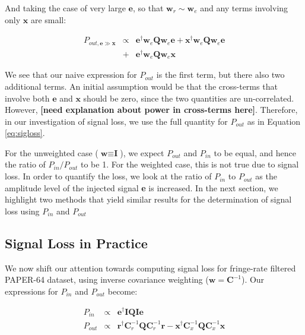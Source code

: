 \documentclass[preprint2,numberedappendix,tighten,twocolappendix]{aastex6}  %
\newcommand{\cc}[1]{{\color{purple} \textbf{[#1]}}}
\begin{document}
And taking the case of very large $\textbf{e}$, so that $\textbf{w}_{r} \sim \textbf{w}_{e}$ and any terms involving only $\textbf{x}$ are small:

\begin{eqnarray}
P_{out, \textbf{e} \gg \textbf{x}} &\propto& \textbf{e}^{\dagger}\textbf{w}_{e}\textbf{Q}\textbf{w}_{e}\textbf{e} + \textbf{x}^{\dagger}\textbf{w}_{e}\textbf{Q}\textbf{w}_{e}\textbf{e} \nonumber \\
&+& \textbf{e}^{\dagger}\textbf{w}_{e}\textbf{Q}\textbf{w}_{e}\textbf{x}
\end{eqnarray}

We see that our naive expression for $P_{out}$ is the first term, but there also two additional terms. An initial assumption would be that the cross-terms that involve both $\textbf{e}$ and $\textbf{x}$ should be zero, since the two quantities are un-correlated. However, \cc{need explanation about power in cross-terms here}. Therefore, in our investigation of signal loss, we use the full quantity for $P_{out}$ as in Equation \ref{eq:sigloss}.

For the unweighted case ($\textbf{w} \equiv \textbf{I}$), we expect $P_{out}$ and $P_{in}$ to be equal, and hence the ratio of $P_{in} / P_{out}$ to be 1. For the weighted case, this is not true due to signal loss. In order to quantify the loss, we look at the ratio of $P_{in}$ to $P_{out}$ as the amplitude level of the injected signal \textbf{e} is increased. In the next section, we highlight two methods that yield similar results for the determination of signal loss using $P_{in}$ and $P_{out}$

\subsection{Signal Loss in Practice}

We now shift our attention towards computing signal loss for fringe-rate filtered PAPER-64 dataset, using inverse covariance weighting ($\textbf{w} = \textbf{C}^{-1}$). Our expressions for $P_{in}$ and $P_{out}$ become:

\begin{eqnarray}
P_{in} &\propto& \textbf{e}^{\dagger}\textbf{I}\textbf{Q}\textbf{I}\textbf{e} \\
P_{out} &\propto& \textbf{r}^{\dagger}\textbf{C}_{r}^{-1}\textbf{Q}\textbf{C}_{r}^{-1}\textbf{r} - \textbf{x}^{\dagger}\textbf{C}_{x}^{-1}\textbf{Q}\textbf{C}_{x}^{-1}\textbf{x} 
\end{eqnarray}
\end{document}
